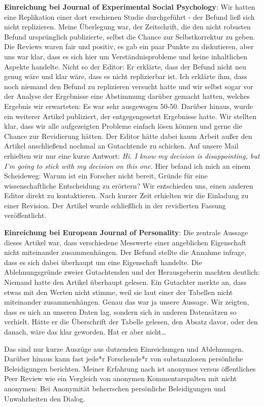 \documentclass[
  letterpaper,
  DIV=11,
  numbers=noendperiod]{scrreprt}
\begin{document}
\begin{tcolorbox}
\textbf{Einreichung bei Journal of Experimental Social Psychology}: Wir
hatten eine Replikation einer dort erschienen Studie durchgeführt - der
Befund ließ sich nicht replizieren. Meine Überlegung war, der
Zeitschrift, die den nicht robusten Befund ursprünglich publizierte,
selbst die Chance zur Selbstkorrektur zu geben. Die Reviews waren fair
und positiv, es gab ein paar Punkte zu diskutieren, aber uns war klar,
dass es sich hier um Verständnisprobleme und keine inhaltlichen Aspekte
handelte. Nicht so der Editor: Er erklärte, dass der Befund nicht neu
genug wäre und klar wäre, dass es nicht replizierbar ist. Ich erklärte
ihm, dass noch niemand den Befund zu replizieren versucht hatte und wir
selbst sogar vor der Analyse der Ergebnisse eine Abstimmung darüber
gemacht hatten, welches Ergebnis wir erwarteten: Es war sehr ausgewogen
50-50. Darüber hinaus, wurde ein weiterer Artikel publiziert, der
entgegengesetzt Ergebnisse hatte. Wir stellten klar, dass wir alle
aufgezeigten Probleme einfach lösen können und gerne die Chance zur
Revidierung hätten. Der Editor hätte dabei kaum Arbeit außer den Artikel
anschließend nochmal an Gutachtende zu schicken. Auf unsere Mail
erhielten wir nur eine kurze Antwort: \emph{Hi. I know my decision is
disappointing, but I'm going to stick with my decision on this one.}
Hier befand ich mich an einem Scheideweg: Warum ist ein Forscher nicht
bereit, Gründe für eine wissenschaftliche Entscheidung zu erörtern? Wir
entschieden uns, einen anderen Editor direkt zu kontaktieren. Nach
kurzer Zeit erhielten wir die Einladung zu einer Revision. Der Artikel
wurde schließlich in der revidierten Fassung veröffentlicht.

\textbf{Einreichung bei European Journal of Personality}: Die zentrale
Aussage dieses Artikel war, dass verschiedene Messwerte einer
angeblichen Eigenschaft nicht miteinander zusammenhängen. Der Befund
stellte die Annahme infrage, dass es sich dabei überhaupt um eine
Eigenschaft handelte. Die Ablehnungsgründe zweier Gutachtenden und der
Herausgeberin machten deutlich: Niemand hatte den Artikel überhaupt
gelesen. Ein Gutachter merkte an, dass etwas mit den Werten nicht
stimme, weil sie laut einer der Tabellen nicht miteinander
zusammenhängen. Genau das war ja unsere Aussage. Wir zeigten, dass es
nich an unseren Daten lag, sondern sich in anderen Datensätzen so
verhielt. Hätte er die Überschrift der Tabelle gelesen, den Absatz
davor, oder den danach, wäre das klar geworden. Hat er aber
nicht\ldots{}

Das sind nur kurze Auszüge aus dutzenden Einreichungen und Ablehnungen.
Darüber hinaus kann fast jede*r Forschende*r von substanzlosen
persönliche Beleidigungen berichten. Meiner Erfahrung nach ist anonymes
versus öffentliches Peer Review wie ein Vergleich von anonymen
Kommentarspalten mit nicht anonymen: Bei Anonymität beherrschen
persönliche Beleidigungen und Unwahrheiten den Dialog.

\end{tcolorbox}
\end{document}
